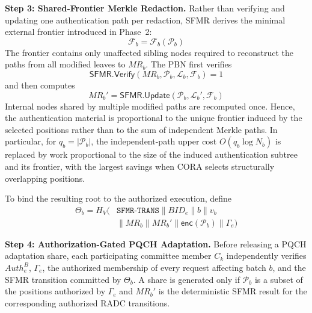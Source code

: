 \documentclass[lettersize,journal]{IEEEtran}
\begin{document}
\medskip
\noindent\textbf{Step 3: Shared-Frontier Merkle Redaction.}
Rather than verifying and updating one authentication path per
redaction, SFMR derives the minimal external frontier introduced in
Phase~2:
\begin{equation}
\mathcal{F}_b
=
\mathcal{F}_b(\mathcal{P}_b)
\end{equation}
The frontier contains only unaffected sibling nodes required to
reconstruct the paths from all modified leaves to $MR_b$. The PBN first
verifies
\begin{equation}
\mathsf{SFMR.Verify}
(MR_b,\mathcal{P}_b,\mathcal{L}_b,\mathcal{F}_b)=1
\end{equation}
and then computes
\begin{equation}
MR_b'
=
\mathsf{SFMR.Update}
(\mathcal{P}_b,\mathcal{L}_b',
\mathcal{F}_b)
\end{equation}
Internal nodes shared by multiple modified paths are recomputed once.
Hence, the authentication material is proportional to the unique
frontier induced by the selected positions rather than to the sum of
independent Merkle paths. In particular, for $q_b=|\mathcal{P}_b|$,
the independent-path upper cost $O(q_b\log N_b)$ is replaced by work
proportional to the size of the induced authentication subtree and its
frontier, with the largest savings when CORA selects structurally
overlapping positions.

To bind the resulting root to the authorized execution, define
\begin{equation}
\begin{aligned}
\Theta_b
=
H_V\big(&\texttt{SFMR-TRANS}\parallel BID_e\parallel b
\parallel v_b\\
&\parallel MR_b\parallel MR_b'
\parallel \mathsf{enc}(\mathcal{P}_b)
\parallel \Gamma_e\big)
\end{aligned}
\label{eq:theta}
\end{equation}

\medskip
\noindent\textbf{Step 4: Authorization-Gated PQCH Adaptation.}
Before releasing a PQCH adaptation share, each participating committee
member $C_k$ independently verifies $Auth_e^B$, $\Gamma_e$, the
authorized membership of every request affecting batch $b$, and the
SFMR transition committed by $\Theta_b$. A share is generated only if
$\mathcal{P}_b$ is a subset of the positions authorized by
$\Gamma_e$ and $MR_b'$ is the deterministic SFMR result for the
corresponding authorized RADC transitions.
\end{document}
